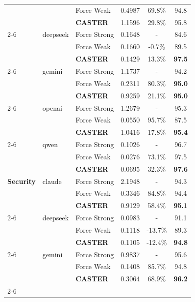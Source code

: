 \documentclass{article}
\theoremstyle{plain}
\theoremstyle{definition}
\theoremstyle{remark}
\begin{document}
\begin{table}[t]
\begin{minipage}{0.48\textwidth}
{\begin{tabular}{lllccc}
             &  & Force Weak & 0.4987 & 69.8\% & 94.8 \\
             &  & \textbf{CASTER} & 1.1596 & 29.8\% & 95.8 \\
             \cmidrule{2-6}
             & deepseek & Force Strong & 0.1648 & - & 84.6 \\
             &  & Force Weak & 0.1660 & -0.7\% & 89.5 \\
             &  & \textbf{CASTER} & 0.1429 & 13.3\% & \textbf{97.5} \\
             \cmidrule{2-6}
             & gemini & Force Strong & 1.1737 & - & 94.2 \\
             &  & Force Weak & 0.2311 & 80.3\% & \textbf{95.0} \\
             &  & \textbf{CASTER} & 0.9259 & 21.1\% & \textbf{95.0} \\
             \cmidrule{2-6}
             & openai & Force Strong & 1.2679 & - & 95.3 \\
             &  & Force Weak & 0.0550 & 95.7\% & 87.5 \\
             &  & \textbf{CASTER} & 1.0416 & 17.8\% & \textbf{95.4} \\
             \cmidrule{2-6}
             & qwen & Force Strong & 0.1026 & - & 96.7 \\
             &  & Force Weak & 0.0276 & 73.1\% & 97.5 \\
             &  & \textbf{CASTER} & 0.0695 & 32.3\% & \textbf{97.6} \\
            \midrule
            \textbf{Security} & claude & Force Strong & 2.1948 & - & 94.3 \\
             &  & Force Weak & 0.3346 & 84.8\% & 94.4 \\
             &  & \textbf{CASTER} & 0.9129 & 58.4\% & \textbf{95.1} \\
             \cmidrule{2-6}
             & deepseek & Force Strong & 0.0983 & - & 91.1 \\
             &  & Force Weak & 0.1118 & -13.7\% & 89.3 \\
             &  & \textbf{CASTER} & 0.1105 & -12.4\% & \textbf{94.8} \\
             \cmidrule{2-6}
             & gemini & Force Strong & 0.9837 & - & 95.6 \\
             &  & Force Weak & 0.1408 & 85.7\% & 94.8 \\
             &  & \textbf{CASTER} & 0.3064 & 68.9\% & \textbf{96.2} \\
             \cmidrule{2-6}

\end{tabular}}
\end{minipage}
\end{table}
\end{document}
